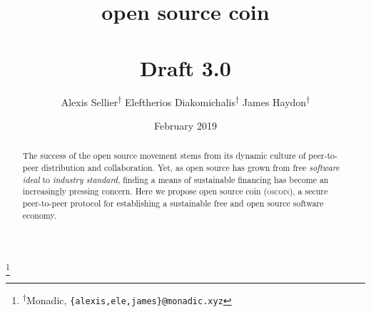 \documentclass[a4paper, oneside, 10pt, final]{amsart}
\begin{document}
\title[open source coin]{open source coin \\ \vspace{0.5em} \\ {\tiny Draft 3.0}}
\author{\Small Alexis Sellier\textsuperscript{$\dagger$} \qquad Eleftherios Diakomichalis\textsuperscript{$\dagger$} \qquad James Haydon\textsuperscript{$\dagger$}}
\date{February 2019}

\thanks{\textsuperscript{$\dagger$}Monadic, \texttt{\{alexis,ele,james\}@monadic.xyz}}

\begin{abstract}
The success of the open source movement stems from its dynamic culture of
peer-to-peer distribution and collaboration. Yet, as open source has grown from
free \emph{software ideal} to \emph{industry standard}, finding a means of
sustainable financing has become an increasingly pressing concern. Here we
propose open source coin (\textsc{oscoin}), a secure peer-to-peer protocol for
establishing a sustainable free and open source software economy.
\end{abstract}

\maketitle
\end{document}
